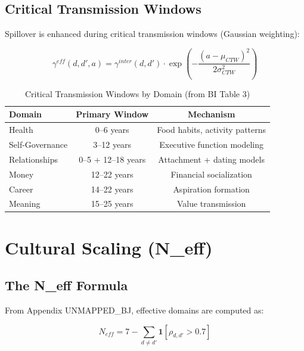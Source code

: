 \subsection{Critical Transmission Windows}

Spillover is enhanced during critical transmission windows (Gaussian weighting):

\begin{equation}
\gamma^{eff}(d, d', a) = \gamma^{inter}(d, d') \cdot \exp\left(-\frac{(a - \mu_{CTW})^2}{2\sigma_{CTW}^2}\right)
\label{eq:ctw-weighting}
\end{equation}

\begin{table}[htbp]
\centering
\caption{Critical Transmission Windows by Domain (from BI Table 3)}
\label{tab:ctw}
\renewcommand{\arraystretch}{1.2}
\begin{tabular}{@{}lcc@{}}
\toprule
\textbf{Domain} & \textbf{Primary Window} & \textbf{Mechanism} \\
\midrule
Health & 0--6 years & Food habits, activity patterns \\
Self-Governance & 3--12 years & Executive function modeling \\
Relationships & 0--5 + 12--18 years & Attachment + dating models \\
Money & 12--22 years & Financial socialization \\
Career & 14--22 years & Aspiration formation \\
Meaning & 15--25 years & Value transmission \\
\bottomrule
\end{tabular}
\end{table}


\section{Cultural Scaling (N\_eff)}
\label{sec:calc-neff}

\subsection{The N\_eff Formula}

From Appendix UNMAPPED_BJ, effective domains are computed as:

\begin{equation}
\boxed{
N_{eff} = 7 - \sum_{d \neq d'} \mathbf{1}[\rho_{d,d'} > 0.7]
}
\label{eq:neff}
\end{equation}

